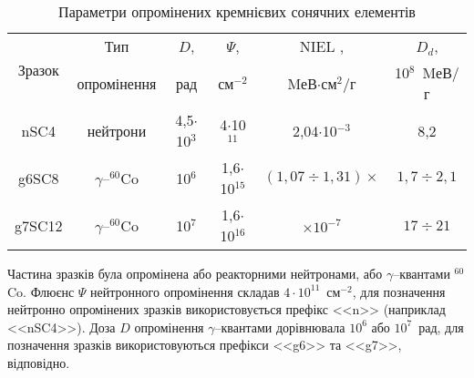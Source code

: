 \begin{table}[b]
\caption{\label{tabSSCSample}Параметри опромінених кремнієвих сонячних елементів
}
\center
\begin{tabular}{|c|c|c|c|c|c|}
\hline
\multirow{2}{*}{Зразок} &Тип&$D$,&$\Psi$, &NIEL \cite{NIEL:Akkerman,NIEL:Messenger,NIEL:Allam},& $D_d$,  \\
&опромінення& рад& см$^{-2}$&MеВ$\cdot$см$^2$/г& 10$^{8}$~MеВ/г \\
\hline
nSC4&нейтрони&4,5$\cdot$10$^3$&4$\cdot$10$^{11}$&2,04$\cdot$10$^{-3}$&8,2\\ \hline
g6SC8&$\gamma$--$^{60}$Co&10$^6$&1,6$\cdot$10$^{15}$&$(1,07\div1,31)\times$&$1,7\div2,1$\\
\cline{1-4}
\cline{6-6}
g7SC12&$\gamma$--$^{60}$Co&10$^7$&1,6$\cdot$10$^{16}$&$\times10^{-7}$&$17\div21$\\ \hline
\end{tabular}
\end{table}

Частина зразків була опромінена або реакторними нейтронами, або $\gamma$--квантами $^{60}$Co.
Флюєнс $\Psi$ нейтронного опромінення складав $4\cdot10^{11}$~см$^{-2}$,
для позначення нейтронно опромінених зразків використовується префікс <<n>> (наприклад <<nSC4>>).
Доза $D$ опромінення $\gamma$--квантами дорівнювала $10^6$ або $10^7$~рад, для позначення зразків використовуються префікси <<g6>> та <<g7>>, відповідно.

